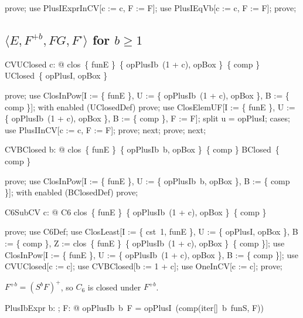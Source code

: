\documentclass{article}
\begin{document}
\begin{zproof}
prove;
use PlusIExprInCV[c := c, F := F];
use PlusIEqVb[c := c, F := F];
prove;
\end{zproof}

\subsection{$\langle E, F^{+b}, FG, F^\square \rangle$ for $b \geq 1$}

\begin{theorem}{CVUClosed}
  \forall c: \nat @ clos~\{ funE \}~\{ opPlusIb~(1 + c), opBox \}~\{ comp \} \in UClosed~\{ opPlusI, opBox \}
\end{theorem}

\begin{zproof}
prove;
use ClosInPow[I := \{ funE \}, U := \{ opPlusIb~(1 + c), opBox \}, B := \{ comp \}];
with enabled (UClosedDef) prove;
use ClosElemUF[I := \{ funE \}, U := \{ opPlusIb~(1 + c), opBox \}, B := \{ comp \}, F := F];
split u = opPlusI;
cases;
use PlusIInCV[c := c, F := F];
prove;
next;
prove;
next;
\end{zproof}

\begin{theorem}{CVBClosed}
  \forall b: \nat @ clos~\{ funE \}~\{ opPlusIb~b, opBox \}~\{ comp \} \in BClosed~\{ comp \}
\end{theorem}

\begin{zproof}
prove;
use ClosInPow[I := \{ funE \}, U := \{ opPlusIb~b, opBox \}, B := \{ comp \}];
with enabled (BClosedDef) prove;
\end{zproof}

\begin{theorem}{C6SubCV}
  \forall c: \nat @ C6 \subseteq clos~\{ funE \}~\{ opPlusIb~(1 + c), opBox \}~\{ comp \}
\end{theorem}

\begin{zproof}
prove;
use C6Def;
use ClosLeast[I := \{ cst~1, funE \}, U := \{ opPlusI, opBox \}, B := \{ comp \}, Z := clos~\{ funE \}~\{ opPlusIb~(1 + c), opBox \}~\{ comp \}];
use ClosInPow[I := \{ funE \}, U := \{ opPlusIb~(1 + c), opBox \}, B := \{ comp \}];
use CVUClosed[c := c];
use CVBClosed[b := 1 + c];
use OneInCV[c := c];
prove;
\end{zproof}

$F^{+b} = (S^b F)^+$, so $C_6$ is closed under $F^{+b}$.

\begin{theorem}{PlusIbExpr}
  \forall b: \nat; F: \nat \fun \nat @ opPlusIb~b~F = opPlusI~(comp(iter[\nat]~b~funS, F))
\end{theorem}
\end{document}
